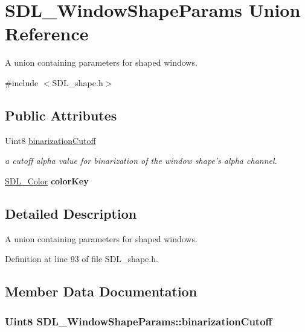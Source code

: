 \hypertarget{unionSDL__WindowShapeParams}{\section{S\+D\+L\+\_\+\+Window\+Shape\+Params Union Reference}
\label{unionSDL__WindowShapeParams}
}


A union containing parameters for shaped windows.  




{\ttfamily \#include $<$S\+D\+L\+\_\+shape.\+h$>$}

\subsection*{Public Attributes}
\begin{DoxyCompactItemize}
\item 
Uint8 \hyperlink{unionSDL__WindowShapeParams_a534c40b09588a8075c0a70227753dc56}{binarization\+Cutoff}
\begin{DoxyCompactList}\small\item\em a cutoff alpha value for binarization of the window shape's alpha channel. \end{DoxyCompactList}\item 
\hypertarget{unionSDL__WindowShapeParams_a8bf3e442a51a1bbf452cfec7c1ed5318}{\hyperlink{structSDL__Color}{S\+D\+L\+\_\+\+Color} {\bfseries color\+Key}}\label{unionSDL__WindowShapeParams_a8bf3e442a51a1bbf452cfec7c1ed5318}

\end{DoxyCompactItemize}


\subsection{Detailed Description}
A union containing parameters for shaped windows. 

Definition at line 93 of file S\+D\+L\+\_\+shape.\+h.



\subsection{Member Data Documentation}
\hypertarget{unionSDL__WindowShapeParams_a534c40b09588a8075c0a70227753dc56}{
\subsubsection[{binarization\+Cutoff}]{\setlength{\rightskip}{0pt plus 5cm}Uint8 S\+D\+L\+\_\+\+Window\+Shape\+Params\+::binarization\+Cutoff}}\label{unionSDL__WindowShapeParams_a534c40b09588a8075c0a70227753dc56}


